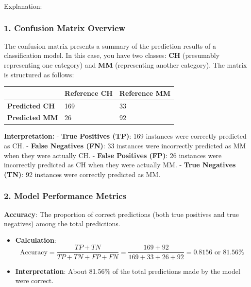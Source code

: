 \documentclass[
]{article}
\providecommand{\tightlist}{%
  \setlength{\itemsep}{0pt}\setlength{\parskip}{0pt}}
\begin{document}
Explanation:

\hypertarget{confusion-matrix-overview}{%
\subsubsection{\texorpdfstring{1. \textbf{Confusion Matrix
Overview}}{1. Confusion Matrix Overview}}\label{confusion-matrix-overview}}

The confusion matrix presents a summary of the prediction results of a
classification model. In this case, you have two classes: \textbf{CH}
(presumably representing one category) and \textbf{MM} (representing
another category). The matrix is structured as follows:

\begin{longtable}[]{@{}lll@{}}
\toprule\noalign{}
& Reference CH & Reference MM \\
\midrule\noalign{}
\endhead
\bottomrule\noalign{}
\endlastfoot
\textbf{Predicted CH} & 169 & 33 \\
\textbf{Predicted MM} & 26 & 92 \\
\end{longtable}

\textbf{Interpretation:} - \textbf{True Positives (TP)}: 169 instances
were correctly predicted as CH. - \textbf{False Negatives (FN)}: 33
instances were incorrectly predicted as MM when they were actually CH. -
\textbf{False Positives (FP)}: 26 instances were incorrectly predicted
as CH when they were actually MM. - \textbf{True Negatives (TN)}: 92
instances were correctly predicted as MM.

\hypertarget{model-performance-metrics}{%
\subsubsection{\texorpdfstring{2. \textbf{Model Performance
Metrics}}{2. Model Performance Metrics}}\label{model-performance-metrics}}

\textbf{Accuracy}: The proportion of correct predictions (both true
positives and true negatives) among the total predictions.

\begin{itemize}
\tightlist
\item
  \textbf{Calculation}: \[
  \text{Accuracy} = \frac{TP + TN}{TP + TN + FP + FN} = \frac{169 + 92}{169 + 33 + 26 + 92} = 0.8156 \text{ or } 81.56\%
  \]
\item
  \textbf{Interpretation}: About 81.56\% of the total predictions made
  by the model were correct.
\end{itemize}
\end{document}
